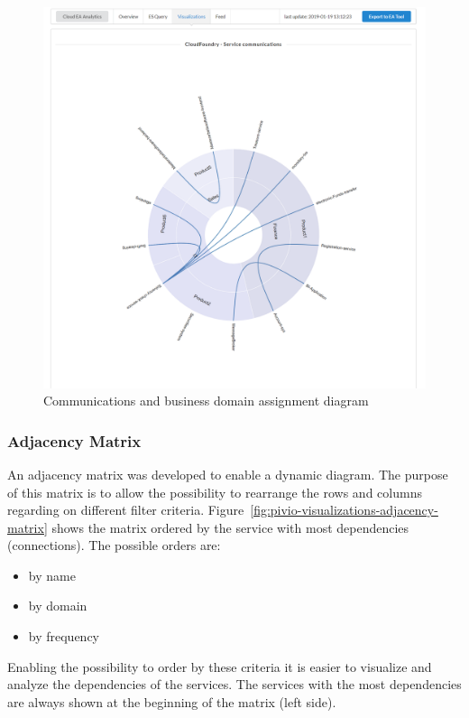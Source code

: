 \begin{figure}[htpb]
  \centering
  \includegraphics[width=1.0\textwidth]{figures/pivio-visualizations-communications.png}
  \caption{Communications and business domain assignment diagram}
  \label{fig:pivio-visualizations-communications}
\end{figure}

\subsubsection{Adjacency Matrix}

An adjacency matrix was developed to enable a dynamic diagram. The purpose of this matrix is to allow the possibility to rearrange the rows and columns regarding on different filter criteria. Figure~\ref{fig:pivio-visualizations-adjacency-matrix} shows the matrix ordered by the service with most dependencies (connections). The possible orders are:
\begin{itemize}
    \item by name
    \item by domain
    \item by frequency
\end{itemize}

Enabling the possibility to order by these criteria it is easier to visualize and analyze the dependencies of the services. The services with the most dependencies are always shown at the beginning of the matrix (left side).

